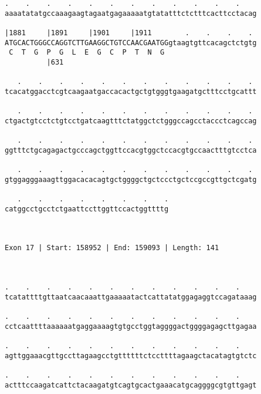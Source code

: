 \documentclass{article}
\begin{document}
\begin{Verbatim}
.    .    .    .    .    .    .    .    .    .    .    .    
aaaatatatgccaaagaagtagaatgagaaaaatgtatatttctctttcacttcctacag
                                                            
|1881     |1891     |1901     |1911        .    .    .    . 
ATGCACTGGGCCAGGTCTTGAAGGCTGTCCAACGAATGGgtaagtgttcacagctctgtg
 C  T  G  P  G  L  E  G  C  P  T  N  G                      
          |631                                              
  
   .    .    .    .    .    .    .    .    .    .    .    . 
tcacatggacctcgtcaagaatgaccacactgctgtgggtgaagatgctttcctgcattt
                                                            
   .    .    .    .    .    .    .    .    .    .    .    . 
ctgactgtcctctgtcctgatcaagtttctatggctctgggccagcctaccctcagccag
                                                            
   .    .    .    .    .    .    .    .    .    .    .    . 
ggtttctgcagagactgcccagctggttccacgtggctccacgtgccaactttgtcctca
                                                            
   .    .    .    .    .    .    .    .    .    .    .    . 
gtggagggaaagttggacacacagtgctggggctgctccctgctccgccgttgctcgatg
                                                            
   .    .    .    .    .    .    .    .
catggcctgcctctgaattccttggttccactggttttg
                                       
                                       
 
Exon 17 | Start: 158952 | End: 159093 | Length: 141



.    .    .    .    .    .    .    .    .    .    .    .    
tcatattttgttaatcaacaaattgaaaaatactcattatatggagaggtccagataaag
                                                            
.    .    .    .    .    .    .    .    .    .    .    .    
cctcaattttaaaaaatgaggaaaagtgtgcctggtaggggactggggagagcttgagaa
                                                            
.    .    .    .    .    .    .    .    .    .    .    .    
agttggaaacgttgccttagaagcctgttttttctccttttagaagctacatagtgtctc
                                                            
.    .    .    .    .    .    .    .    .    .    .    .    
actttccaagatcattctacaagatgtcagtgcactgaaacatgcaggggcgtgttgagt
                                                            

\end{Verbatim}
\end{document}
